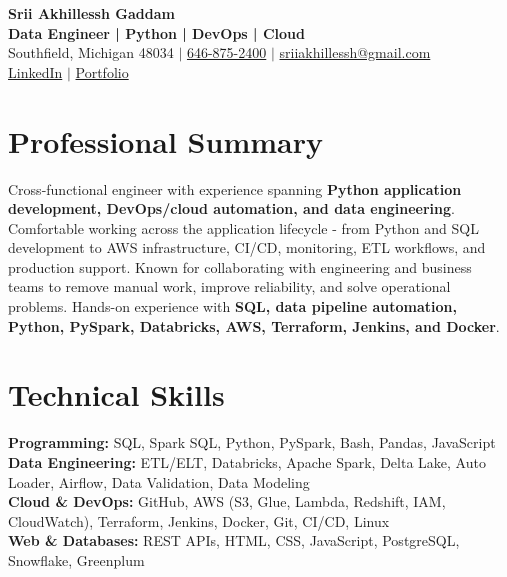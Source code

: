 \documentclass[letterpaper,10pt]{article}
\begin{document}
\fontsize{9.35pt}{10.45pt}\selectfont

\begin{center}
    {\LARGE \textbf{Srii Akhillessh Gaddam}} \\[-1pt]
    \textbf{Data Engineer | Python | DevOps | Cloud} \\[2pt]
    Southfield, Michigan 48034 $|$
    \href{tel:6468752400}{646-875-2400} $|$
    \href{mailto:sriiakhillessh@gmail.com}{sriiakhillessh@gmail.com} \\[1pt]
    \href{https://www.linkedin.com/in/srii-akhiilessh-gaddam-b48668191/}{LinkedIn} $|$
    \href{https://sriiakhillesshg.github.io/portfolio/}{Portfolio}
\end{center}
\vspace{-8pt}

\section{Professional Summary}
\small{Cross-functional engineer with experience spanning \textbf{Python application development, DevOps/cloud automation, and data engineering}. Comfortable working across the application lifecycle - from Python and SQL development to AWS infrastructure, CI/CD, monitoring, ETL workflows, and production support. Known for collaborating with engineering and business teams to remove manual work, improve reliability, and solve operational problems. Hands-on experience with \textbf{SQL, data pipeline automation, Python, PySpark, Databricks, AWS, Terraform, Jenkins, and Docker}.}

\section{Technical Skills}
\small{
\textbf{Programming:} SQL, Spark SQL, Python, PySpark, Bash, Pandas, JavaScript \\
\textbf{Data Engineering:} ETL/ELT, Databricks, Apache Spark, Delta Lake, Auto Loader, Airflow, Data Validation, Data Modeling \\
\textbf{Cloud \& DevOps:} GitHub, AWS (S3, Glue, Lambda, Redshift, IAM, CloudWatch), Terraform, Jenkins, Docker, Git, CI/CD, Linux \\
\textbf{Web \& Databases:} REST APIs, HTML, CSS, JavaScript, PostgreSQL, Snowflake, Greenplum
}

\end{document}
